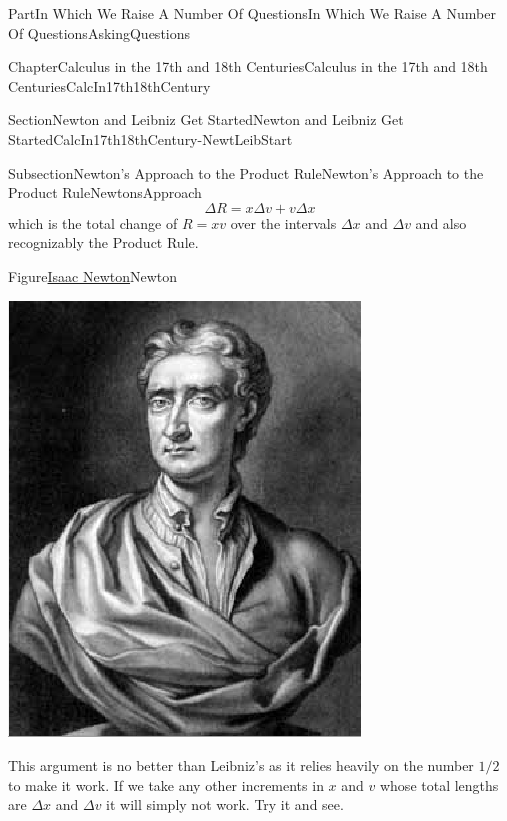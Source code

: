\documentclass[oneside,10pt,]{book}
\numberwithin{equation}{part}
\begin{document}
\begin{partptx}{Part}{In Which We Raise A Number Of Questions}{}{In Which We Raise A Number Of Questions}{}{}{AskingQuestions}
\begin{chapterptx}{Chapter}{Calculus in the 17th and 18th Centuries}{}{Calculus in the 17th and 18th Centuries}{}{}{CalcIn17th18thCentury}
\begin{sectionptx}{Section}{Newton and Leibniz Get Started}{}{Newton and Leibniz Get Started}{}{}{CalcIn17th18thCentury-NewtLeibStart}
\begin{subsectionptx}{Subsection}{Newton's Approach to the Product Rule}{}{Newton's Approach to the Product Rule}{}{}{NewtonsApproach}
\begin{equation*}
\Delta R = x\Delta v + v\Delta x
\end{equation*}
which is the total change of \(R = xv\) over the intervals \(\Delta x\) and \(\Delta v\) and also recognizably the Product Rule.%
\begin{figureptx}{Figure}{\href{https://mathshistory.st-andrews.ac.uk/Biographies/Newton/}{Isaac Newton}\protect\footnotemark{}}{Newton}{}%
%
\begin{image}{0.325}{0.35}{0.325}{}%
\includegraphics[width=\linewidth]{external/images/Newton.png}
\end{image}%
\tcblower
\end{figureptx}%
%
This argument is no better than Leibniz's as it relies heavily on the number \(1/2\) to make it work.  If we take any other increments in \(x\) and \(v\) whose total lengths are \(\Delta x\) and \(\Delta v\) it will simply not work.  Try it and see.%
\par

\end{subsectionptx}
\end{sectionptx}
\end{chapterptx}
\end{partptx}
\end{document}
